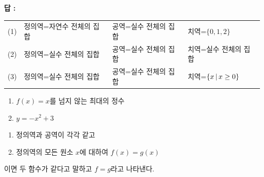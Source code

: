 \documentclass{oblivoir}
\begin{document}
{\noindent\textbf{답 :}
\footnotesize
\begin{tabu}[t]{X[0.2]@{}X[1.1]XX}
(1)	&정의역=자연수 전체의 집합	&공역=실수 전체의 집합	&치역=\(\{0,1,2\}\)\\
(2)	&정의역=실수 전체의 집합		&공역=실수 전체의 집합	&치역=실수 전체의 집합\\
(3)	&정의역=실수 전체의 집합		&공역=실수 전체의 집합	&치역=\(\{x\,|\, x\ge0\}\)
\end{tabu}
}

%
\begin{enumerate}\label{function7}
\item
\(f(x)=x\text{를 넘지 않는 최대의 정수}\)
\item
\(y=-x^2+3\)
\end{enumerate}

\newpage
\begin{mdframed}
%
\begin{enumerate}\label{function8}
\item
정의역과 공역이 각각 같고
\item
정의역의 모든 원소 \(x\)에 대하여 \(f(x)=g(x)\)
\end{enumerate}
이면 두 함수가 같다고 말하고 \(f=g\)라고 나타낸다.
\end{mdframed}

\end{document}
